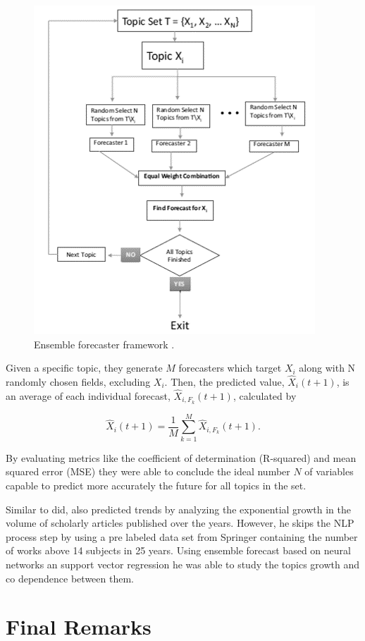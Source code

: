 \begin{figure}[h!]
	\centering
	\includegraphics[width=0.5\linewidth]{01.Chapters/03.RelatedWorks/ensemble-forecasting-framework}
	\caption{Ensemble forecaster framework \cite{hurtado2016topic}.}
	\label{fig:ensemble-forecasting-framework}
\end{figure}

Given a specific topic, they generate $M$ forecasters which target $X_{i}$ along with N randomly chosen fields, excluding $X_{i}$. Then, the predicted value, $\hat{X}_{i}(t+1)$, is an average of each individual forecast, $\hat{X}_{i, F_{k}}(t+1)$, calculated by 

\begin{equation}
	\hat{X}_{i}(t+1) = \dfrac{1}{M} \sum_{k=1}^{M}\hat{X}_{i, F_{k}}(t+1)\text{.}
\end{equation}

By evaluating metrics like the coefficient of determination (R-squared) and mean squared error (MSE) they were able to conclude the ideal number $N$ of variables capable to predict more accurately the future for all topics in the set.

Similar to  did,  also predicted trends by analyzing the exponential growth in the volume of scholarly articles published over the years. However, he skips the NLP process step by using a pre labeled data set from Springer containing the number of works above 14 subjects in 25 years. Using ensemble forecast based on neural networks an support vector regression he was able to study the topics growth and co dependence between them.


\section{Final Remarks}

